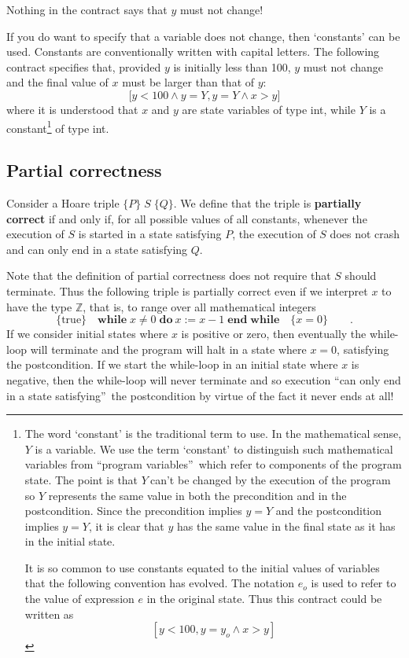 \documentclass[muchmore,11pt]{article}%
\begin{document}
\noindent Nothing in the contract says that $y$ must not change!

If you do want to specify that a variable does not change, then `constants'
can be used. Constants are conventionally written with capital letters. The
following contract specifies that, provided $y$ is initially less than 100,
$y$ must not change and the final value of $x$ must be larger than that of
$y$:%
\[
\lbrack y<\mathrm{100}\wedge y=Y,y=Y\wedge x>y]
\]
where it is understood that $x$ and $y$ are state variables of type
\textsf{int},\textsf{ }while $Y$ is a constant\footnote{The word `constant' is
the traditional term to use. In the mathematical sense, $Y$ is a variable. We
use the term `constant' to distinguish such mathematical variables from
\textquotedblleft program variables\textquotedblright\ which refer to
components of the program state. The point is that $Y\ $can't be changed by
the execution of the program so $Y$ represents the same value in both the
precondition and in the postcondition. Since the precondition implies $y=Y$
and the postcondition implies $y=Y$, it is clear that $y$ has the same value
in the final state as it has in the initial state.
\par
It is so common to use constants equated to the initial values of variables
that the following convention has evolved. The notation $e_{o}$ is used to
refer to the value of expression $e$ in the original state. Thus this contract
could be written as%
\[
\left[  y<100,y=y_{o}\wedge x>y\right]
\]
} of type \textsf{int}.

\subsection{Partial correctness}

Consider a Hoare triple $\{P\}\;S\;\{Q\}$. We define that the triple is
\textbf{partially correct} if and only if, for all possible values of all
constants, whenever the execution of $S$ is started in a state satisfying $P$,
the execution of $S$ does not crash and can only end in a state satisfying $Q$.

Note that the definition of partial correctness does not require that $S$
should terminate. Thus the following triple is partially correct even if we
interpret $x$ to have the type $\mathbb{Z}$, that is, to range over all
mathematical integers%
\[
\{\mathrm{true}\}\quad\mathbf{while}\;x\neq0\;\mathbf{do}%
\ x:=x-1\;\mathbf{end\;while}\quad\{x=0\}\qquad\text{.}%
\]
If we consider initial states where $x$ is positive or zero, then eventually
the while-loop will terminate and the program will halt in a state where
$x=0$, satisfying the postcondition. If we start the while-loop in an initial
state where $x$ is negative, then the while-loop will never terminate and so
execution \textquotedblleft can only end in a state
satisfying\textquotedblright\ the postcondition by virtue of the fact it never
ends at all!
\end{document}
